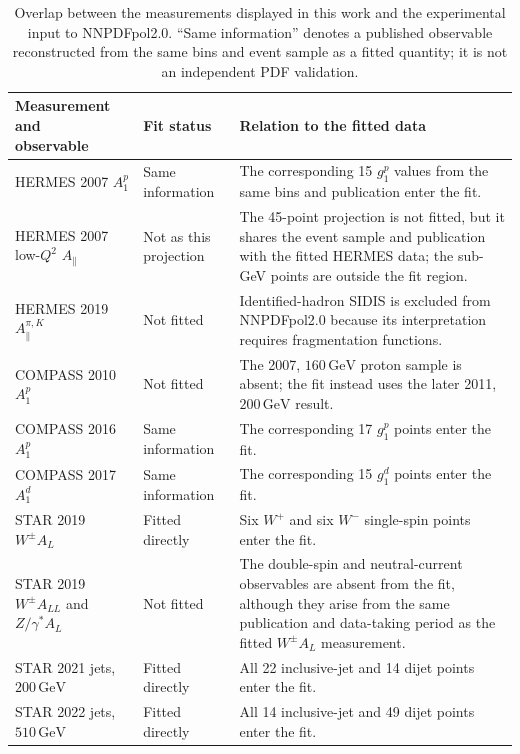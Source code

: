 \documentclass[11pt,a4paper]{article}
\newcommand{\GeV}{\ensuremath{\,\mathrm{GeV}}}
\begin{document}
\begin{table}[t]
  \centering
  \caption{Overlap between the measurements displayed in this work and the
  experimental input to NNPDFpol2.0.  ``Same information'' denotes a
  published observable reconstructed from the same bins and event sample as
  a fitted quantity; it is not an independent PDF validation.}
  \label{tab:nnpdf-overlap}
  \footnotesize
  \setlength{\tabcolsep}{4pt}
  \renewcommand{\arraystretch}{1.08}
  \begin{tabular}{@{}p{}p{}p{}@{}}
    \toprule
    \shortstack[l]{Measurement and\\observable} &
      Fit status & Relation to the fitted data \\
    \midrule
    HERMES 2007 $A_1^p$ & Same information &
      The corresponding 15 $g_1^p$ values from the same bins and publication
      enter the fit. \\
    HERMES 2007 low-$Q^2$ $A_\parallel$ & Not as this projection &
      The 45-point projection is not fitted, but it shares the event sample
      and publication with the fitted HERMES data; the sub-GeV points are
      outside the fit region. \\
    HERMES 2019 $A_\parallel^{\pi,K}$ & Not fitted &
      Identified-hadron SIDIS is excluded from NNPDFpol2.0 because its
      interpretation requires fragmentation functions. \\
    \addlinespace[2pt]
    COMPASS 2010 $A_1^p$ & Not fitted &
      The 2007, $160\GeV$ proton sample is absent; the fit instead uses the
      later 2011, $200\GeV$ result. \\
    COMPASS 2016 $A_1^p$ & Same information &
      The corresponding 17 $g_1^p$ points enter the fit. \\
    COMPASS 2017 $A_1^d$ & Same information &
      The corresponding 15 $g_1^d$ points enter the fit. \\
    \addlinespace[2pt]
    STAR 2019 $W^\pm A_L$ & Fitted directly &
      Six $W^+$ and six $W^-$ single-spin points enter the fit. \\
    STAR 2019 $W^\pm A_{LL}$ and $Z/\gamma^* A_L$ & Not fitted &
      The double-spin and neutral-current observables are absent from the
      fit, although they arise from the same publication and data-taking
      period as the fitted $W^\pm A_L$ measurement. \\
    STAR 2021 jets, $200\GeV$ & Fitted directly &
      All 22 inclusive-jet and 14 dijet points enter the fit. \\
    STAR 2022 jets, $510\GeV$ & Fitted directly &
      All 14 inclusive-jet and 49 dijet points enter the fit. \\
    \bottomrule
  \end{tabular}
\end{table}
\end{document}
